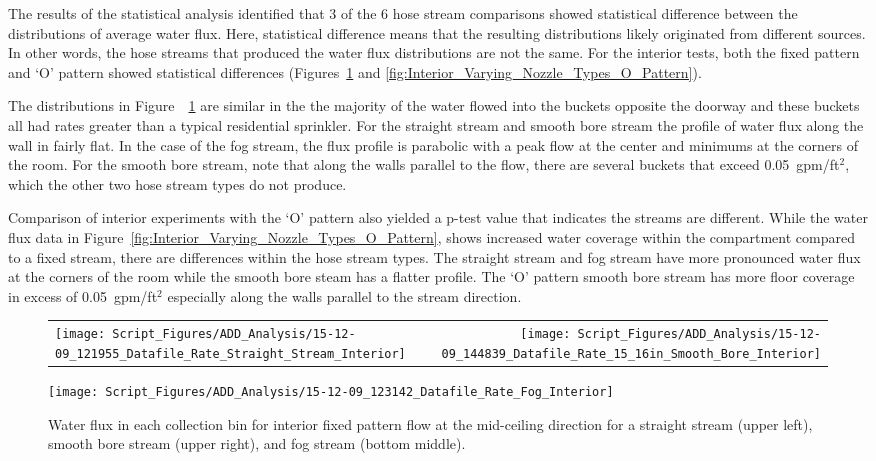 \documentclass[12pt,oneside]{book}
\begin{document}
The results of the statistical analysis identified that 3 of the 6 hose stream comparisons showed statistical difference between the distributions of average water flux. Here, statistical difference means that the resulting distributions likely originated from different sources. In other words, the hose streams that produced the water flux distributions are not the same. For the interior tests, both the fixed pattern and `O' pattern showed statistical differences (Figures~\ref{fig:Interior_Varying_Nozzle_Types_Fixed_Pattern} and \ref{fig:Interior_Varying_Nozzle_Types_O_Pattern}). 

The distributions in Figure~~\ref{fig:Interior_Varying_Nozzle_Types_Fixed_Pattern} are similar in the the majority of the water flowed into the buckets opposite the doorway and these buckets all had rates greater than a typical residential sprinkler. For the straight stream and smooth bore stream the profile of water flux along the wall in fairly flat. In the case of the fog stream, the flux profile is parabolic with a peak flow at the center and minimums at the corners of the room. For the smooth bore stream, note that along the walls parallel to the flow, there are several buckets that exceed 0.05~gpm/ft$^2$, which the other two hose stream types do not produce. 

Comparison of interior experiments with the `O' pattern also yielded a p-test value that indicates the streams are different. While the water flux data in Figure~\ref{fig:Interior_Varying_Nozzle_Types_O_Pattern}, shows increased water coverage within the compartment compared to a fixed stream, there are differences within the hose stream types. The straight stream and fog stream have more pronounced water flux at the corners of the room while the smooth bore steam has a flatter profile. The `O' pattern smooth bore stream has more floor coverage in excess of 0.05~gpm/ft$^2$ especially along the walls parallel to the stream direction.


\begin{figure}[!ht]
\begin{tabular*}{\textwidth}{lr}
\texttt{[image: Script\_Figures/ADD\_Analysis/15-12-09\_121955\_Datafile\_Rate\_Straight\_Stream\_Interior]} &
\texttt{[image: Script\_Figures/ADD\_Analysis/15-12-09\_144839\_Datafile\_Rate\_15\_16in\_Smooth\_Bore\_Interior]} \\
\end{tabular*}
\centering
\texttt{[image: Script\_Figures/ADD\_Analysis/15-12-09\_123142\_Datafile\_Rate\_Fog\_Interior]} \\
\caption[Water Flux for Varying Interior Fixed Pattern Hose Stream Types]{Water flux in each collection bin for interior fixed pattern flow at the mid-ceiling direction for a straight stream (upper left), smooth bore stream (upper right), and fog stream (bottom middle).}
\label{fig:Interior_Varying_Nozzle_Types_Fixed_Pattern}
\end{figure}
\end{document}

